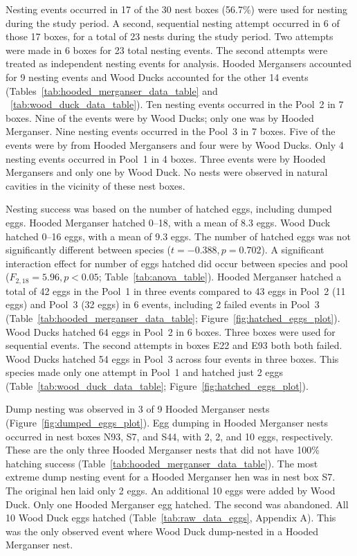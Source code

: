 Nesting events occurred in 17 of the 30 nest boxes (56.7\%) were used for nesting during the study period. A second, sequential nesting attempt occurred in 6 of those 17 boxes, for a total of 23 nests during the study period. Two attempts were made in 6 boxes for 23 total nesting events. The second attempts were treated as independent nesting events for analysis. 
Hooded Mergansers accounted for 9 nesting events and Wood Ducks accounted for the other 14 events (Tables~\ref{tab:hooded_merganser_data_table} and ~\ref{tab:wood_duck_data_table}).  Ten nesting events occurred in the Pool~2 in 7 boxes. Nine of the events were by Wood Ducks; only one was by Hooded Merganser. Nine nesting events occurred in the Pool~3 in 7 boxes. Five of the events were by from Hooded Mergansers and four were by Wood Ducks. Only 4 nesting events occurred in Pool~1 in 4 boxes. Three events were by Hooded Mergansers and only one by Wood Duck. No nests were observed in natural cavities in the vicinity of these nest boxes.  





Nesting success was based on the number of hatched eggs, including dumped eggs. Hooded Merganser hatched \numrange[range-phrase = –]{0}{18}, with a mean of \num{8.3} eggs. Wood Duck hatched \numrange[range-phrase = –]{0}{16} eggs, with a mean of \num{9.3} eggs. The number of hatched eggs was not significantly different between species ($t = -0.388, p = 0.702$). A significant interaction effect for number of eggs hatched did occur between species and pool ($F_{2,18} = 5.96, p < 0.05$; Table~\ref{tab:anova_table}). Hooded Merganser hatched a total of 42 eggs in the Pool~1 in three events compared to 43 eggs in Pool~2 (11 eggs) and Pool~3 (32 eggs) in 6 events, including 2 failed events in Pool~3 (Table~\ref{tab:hooded_merganser_data_table}; Figure~\ref{fig:hatched_eggs_plot}). Wood Ducks hatched 64 eggs in Pool~2 in 6 boxes. Three boxes were used for sequential events. The second attempts in boxes E22 and E93 both both failed. Wood Ducks hatched 54 eggs in Pool~3 across four events in three boxes. This species made only one attempt in Pool~1 and hatched just 2 eggs (Table~\ref{tab:wood_duck_data_table}; Figure~\ref{fig:hatched_eggs_plot}). 



 

Dump nesting was observed in 3 of 9 Hooded Merganser nests (Figure~\ref{fig:dumped_eggs_plot}). Egg dumping in Hooded Merganser nests occurred in nest boxes N93, S7, and S44, with 2, 2, and 10 eggs, respectively. These are the only three Hooded Merganser nests that did not have 100\% hatching success (Table~\ref{tab:hooded_merganser_data_table}). The most extreme dump nesting event for a Hooded Merganser hen was in nest box S7. The original hen laid only 2 eggs. An additional 10 eggs were added by Wood Duck. Only one Hooded Merganser egg hatched. The second was abandoned. All 10 Wood Duck eggs hatched (Table~\ref{tab:raw_data_eggs}, Appendix A). This was the only observed event where Wood Duck dump-nested in a Hooded Merganser nest.

